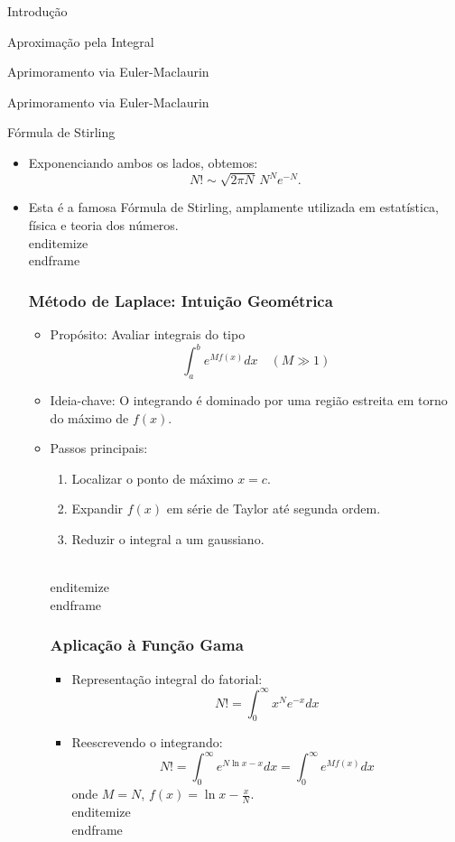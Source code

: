 \documentclass[11pt]{beamer}
\begin{document}
\begin{frame}
\begin{frame}
\begin{itemize}
\begin{frame}{Introdução}
\begin{itemize}
\begin{frame}{Aproximação pela Integral}
\begin{itemize}
\begin{frame}{Aprimoramento via Euler-Maclaurin}
\begin{itemize}
\begin{frame}{Aprimoramento via Euler-Maclaurin}
\begin{itemize}
\begin{frame}{Fórmula de Stirling}
  \begin{itemize}
    \item Exponenciando ambos os lados, obtemos:
      \[
      N! \sim \sqrt{2\pi N}\, N^N e^{-N}.
      \]
    \item Esta é a famosa Fórmula de Stirling, amplamente utilizada em estatística, física e teoria dos números.
  \\end{itemize}
\\end{frame}



\begin{frame}
\frametitle{Método de Laplace: Intuição Geométrica}
\begin{itemize}
\item Propósito: Avaliar integrais do tipo
\[ \int_a^b e^{M f(x)} dx \quad (M \gg 1) \]
\item Ideia-chave: O integrando é dominado por uma região estreita em torno do máximo de \( f(x) \).

\item Passos principais:
\begin{enumerate}
\item Localizar o ponto de máximo \( x = c \).
\item Expandir \( f(x) \) em série de Taylor até segunda ordem.
\item Reduzir o integral a um gaussiano.
\end{enumerate}
\\end{itemize}
\\end{frame}

\begin{frame}
\frametitle{Aplicação à Função Gama}
\begin{itemize}
\item Representação integral do fatorial:
\[ N! = \int_0^\infty x^N e^{-x} dx \]
\item Reescrevendo o integrando:
\[
N! = \int_0^\infty e^{N \ln x - x} dx = \int_0^\infty e^{M f(x)} dx
\]
onde \( M = N \), \( f(x) = \ln x - \frac{x}{N} \).
\\end{itemize}
\\end{frame}


\end{itemize}
\end{frame}
\end{itemize}
\end{frame}
\end{itemize}
\end{frame}
\end{itemize}
\end{frame}
\end{itemize}
\end{frame}
\end{itemize}
\end{frame}
\end{itemize}
\end{frame}
\end{itemize}
\end{frame}
\end{frame}
\end{document}
